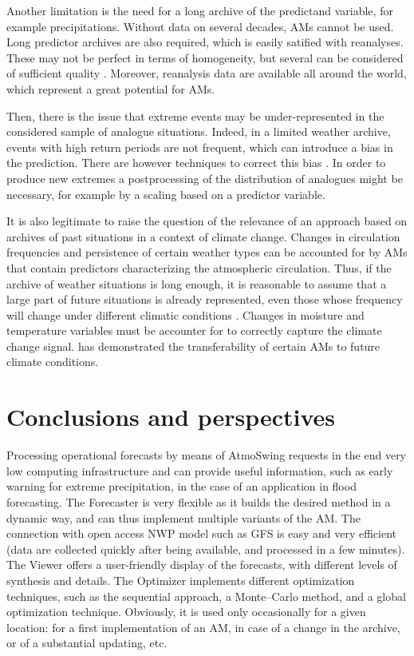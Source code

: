 \documentclass[review]{elsarticle}
\begin{document}
Another limitation is the need for a long archive of the predictand variable, for example precipitations. Without data on several decades, AMs cannot be used. Long predictor archives are also required, which is easily satified with reanalyses. These may not be perfect in terms of homogeneity, but several can be considered of sufficient quality \cite{Horton2018b}. Moreover, reanalysis data are available all around the world, which represent a great potential for AMs.

Then, there is the issue that extreme events may be under-represented in the considered sample of analogue situations. Indeed, in a limited weather archive, events with high return periods are not frequent, which can introduce a bias in the prediction. There are however techniques to correct this bias \citep[see][]{Marty2010}. In order to produce new extremes a postprocessing of the distribution of analogues might be necessary, for example by a scaling based on a predictor variable.

It is also legitimate to raise the question of the relevance of an approach based on archives of past situations in a context of climate change. Changes in circulation frequencies and persistence of certain weather types \citep{Hewitson1996} can be accounted for by AMs that contain predictors characterizing the atmospheric circulation. Thus, if the archive of weather situations is long enough, it is reasonable to assume that a large part of future situations is already represented, even those whose frequency will change under different climatic conditions \citep{Wetterhall2005}. Changes in moisture and temperature variables must be accounter for to correctly capture the climate change signal. \citet{Dayon2015} has demonstrated the transferability of certain AMs to future climate conditions.


\section{Conclusions and perspectives}
\label{sec:conclusions}

Processing operational forecasts by means of AtmoSwing requests in the end very low computing infrastructure and can provide useful information, such as early warning for extreme precipitation, in the case of an application in flood forecasting. The Forecaster is very flexible as it builds the desired method in a dynamic way, and can thus implement multiple variants of the AM. The connection with open access NWP model such as GFS is easy and very efficient (data are collected quickly after being available, and processed in a few minutes). The Viewer offers a user-friendly display of the forecasts, with different levels of synthesis and details. The Optimizer implements different optimization techniques, such as the sequential approach, a Monte--Carlo method, and a global optimization technique. Obviously, it is used only occasionally for a given location: for a first implementation of an AM, in case of a change in the archive, or of a substantial updating, etc.
\end{document}
